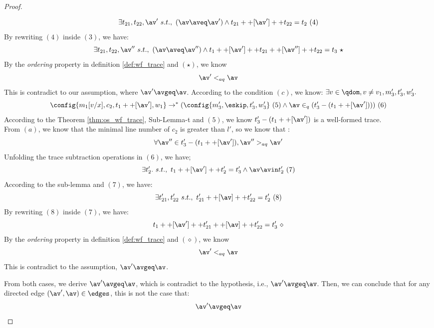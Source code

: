 \begin{proof}
{\begin{itemize}
%
\[
  \exists t_{21}, t_{22}, \av' ~ s.t.,~ (\av \aveq \av') \land t_{21} ++ [\av'] ++ t_{22} = t_2 ~ (4)
\]
%
By rewriting $(4)$ inside $(3)$, we have:
%
\[
  \exists t_{21}, t_{22}, \av'' ~ s.t.,~ (\av \aveq \av'') \land t_1 ++[\av'] ++ t_{21} ++ [\av''] ++ t_{22} = t_3 ~ \star
\]
%
By the \emph{ordering} property in definition \ref{def:wf_trace} and $(\star)$, we know
%
\[
  \av' <_{aq} \av
\]
%
This is contradict to our assumption, where $\av' \avgeq \av$. 
%
%
%
According to the condition $(c)$, we know: $\exists v \in \qdom, v \neq v_1, m_3', t_3', w_3'.$
\[ 
  \config{m_1[v/x], {c_2}, t_1 ++ [\av'], w_1} 
  \rightarrow^{*} (\config{m_3', \eskip, t_3', w_3'} ~ (5)
  \land \av  \in_{q} (t_3' - (t_1 ++ [\av']))) ~ (6)
\] 
%
According to the Theorem \ref{thm:os_wf_trace}, Sub-Lemma-t and $(5)$,
we know $t_3'- (t_1 ++ [\av'])$ is a well-formed trace.
\\
From $(a)$, we know that the minimal line number of $c_2$ is greater than $l'$, so we know that : 
\[
  \forall \av'' \in t_3'- (t_1 ++ [\av']), \av''>_{aq} \av'
\]
%
Unfolding the trace subtraction operations in $(6)$, we have;
\[
  \exists t_2'. ~ s.t., ~ t_1 ++[\av'] ++ t_2' = t_3' \land \av \avin t_2' ~ (7)
\]
%
%
According to the sub-lemma and $(7)$, we have:
%
\[
  \exists t_{21}', t_{22}' ~ s.t.,~ t_{21}' ++ [\av] ++ t_{22}' = t_2' ~ (8)
\]
%
By rewriting $(8)$ inside $(7)$, we have:
%
\[
  t_1 ++[\av'] ++ t_{21}' ++ [\av] ++ t_{22}' = t_3' ~ \diamond
\]
%
By the \emph{ordering} property in definition \ref{def:wf_trace} and $(\diamond)$, we know
%
\[
  \av' <_{aq} \av
\]
%
This is contradict to the assumption,  $\av' \avgeq \av$.
%
\end{itemize}
%
From both cases, we derive $\av' \avgeq \av$, which is contradict to the hypothesis, i.e., $\av' \avgeq \av$.
Then, we can conclude that 
for any directed edge $(\av', \av) \in \edges$, 
this is not the case that:
%
$$\av' \avgeq \av$$
%
}
\end{proof}
%
%
%